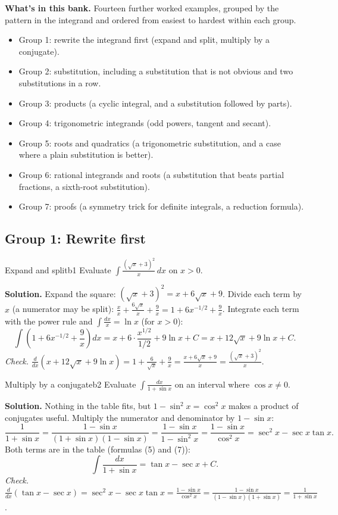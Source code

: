 \documentclass[11pt]{article}
\begin{document}
\textbf{What's in this bank.} Fourteen further worked examples, grouped by the pattern in the integrand and ordered from easiest to hardest within each group.
\begin{itemize}[nosep]
  \item Group 1: rewrite the integrand first (expand and split, multiply by a conjugate).
  \item Group 2: substitution, including a substitution that is not obvious and two substitutions in a row.
  \item Group 3: products (a cyclic integral, and a substitution followed by parts).
  \item Group 4: trigonometric integrands (odd powers, tangent and secant).
  \item Group 5: roots and quadratics (a trigonometric substitution, and a case where a plain substitution is better).
  \item Group 6: rational integrands and roots (a substitution that beats partial fractions, a sixth-root substitution).
  \item Group 7: proofs (a symmetry trick for definite integrals, a reduction formula).
\end{itemize}

\subsection*{Group 1: Rewrite first}

\begin{exmp}{Expand and split}{b1}
Evaluate $\displaystyle\int\frac{\left(\sqrt x+3\right)^2}x\,dx$ on $x>0$.

\textbf{Solution.} Expand the square: $\left(\sqrt x+3\right)^2=x+6\sqrt x+9$. Divide each term by $x$ (a numerator may be split): $\frac{x}x+\frac{6\sqrt x}x+\frac9x=1+6x^{-1/2}+\frac9x$. Integrate each term with the power rule and $\int\frac{dx}x=\ln x$ (for $x>0$):
\[\int\left(1+6x^{-1/2}+\frac9x\right)dx=x+6\cdot\frac{x^{1/2}}{1/2}+9\ln x+C=x+12\sqrt x+9\ln x+C .\]
\emph{Check.} $\frac d{dx}\left(x+12\sqrt x+9\ln x\right)=1+\frac6{\sqrt x}+\frac9x=\frac{x+6\sqrt x+9}x=\frac{(\sqrt x+3)^2}x$.
\end{exmp}

\begin{exmp}{Multiply by a conjugate}{b2}
Evaluate $\displaystyle\int\frac{dx}{1+\sin x}$ on an interval where $\cos x\ne0$.

\textbf{Solution.} Nothing in the table fits, but $1-\sin^2x=\cos^2x$ makes a product of conjugates useful. Multiply the numerator and denominator by $1-\sin x$:
\[\frac1{1+\sin x}=\frac{1-\sin x}{(1+\sin x)(1-\sin x)}=\frac{1-\sin x}{1-\sin^2x}=\frac{1-\sin x}{\cos^2x}=\sec^2x-\sec x\tan x .\]
Both terms are in the table (formulas (5) and (7)):
\[\int\frac{dx}{1+\sin x}=\tan x-\sec x+C .\]
\emph{Check.} $\frac d{dx}(\tan x-\sec x)=\sec^2x-\sec x\tan x=\frac{1-\sin x}{\cos^2x}=\frac{1-\sin x}{(1-\sin x)(1+\sin x)}=\frac1{1+\sin x}$.
\end{exmp}
\end{document}
